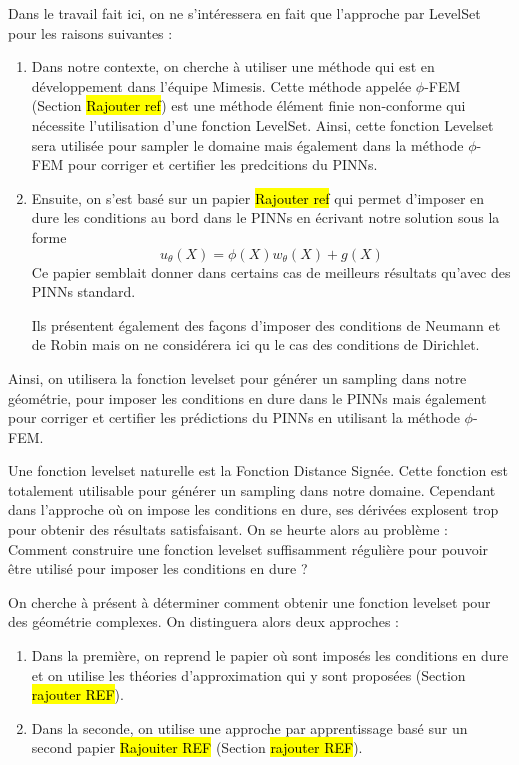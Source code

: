 Dans le travail fait ici, on ne s'intéressera en fait que l'approche par LevelSet pour les raisons suivantes :
\begin{enumerate}[label=\textbullet]
	\item Dans notre contexte, on cherche à utiliser une méthode qui est en développement dans l'équipe Mimesis. Cette méthode appelée $\phi$-FEM (Section \hl{Rajouter ref}) est une méthode élément finie  non-conforme qui nécessite l'utilisation d'une fonction LevelSet. Ainsi, cette fonction Levelset sera utilisée pour sampler le domaine mais également dans la méthode $\phi$-FEM pour corriger et certifier les predcitions du PINNs.
	\item Ensuite, on s'est basé sur un papier \hl{Rajouter ref} qui permet d'imposer en dure les conditions au bord dans le PINNs en écrivant notre solution sous la forme
	\begin{equation*}
		u_\theta(X)=\phi(X)w_\theta(X)+g(X)
	\end{equation*}
	Ce papier semblait donner dans certains cas de meilleurs résultats qu'avec des PINNs standard.
	\begin{Rem}
		Ils présentent également des façons d'imposer des conditions de Neumann et de Robin mais on ne considérera ici qu le cas des conditions de Dirichlet.
	\end{Rem}
\end{enumerate}
Ainsi, on utilisera la fonction levelset pour générer un sampling dans notre géométrie, pour imposer les conditions en dure dans le PINNs mais également pour corriger et certifier les prédictions du PINNs en utilisant la méthode $\phi$-FEM.

\begin{Rem}
	Une fonction levelset naturelle est la Fonction Distance Signée. Cette fonction est totalement utilisable pour générer un sampling dans notre domaine. Cependant dans l'approche où on impose les conditions en dure, ses dérivées explosent trop pour obtenir des résultats satisfaisant. On se heurte alors au problème : Comment construire une fonction levelset suffisamment régulière pour pouvoir être utilisé pour imposer les conditions en dure ?
\end{Rem}

On cherche à présent à déterminer comment obtenir une fonction levelset pour des géométrie complexes. On distinguera alors deux approches :
\begin{enumerate}[label=\textbullet]
	\item Dans la première, on reprend le papier où sont imposés les conditions en dure et on utilise les théories d'approximation qui y sont proposées (Section \hl{rajouter REF}).
	\item Dans la seconde, on utilise une approche par apprentissage basé sur un second papier \hl{Rajouiter REF} (Section \hl{rajouter REF}).
\end{enumerate}